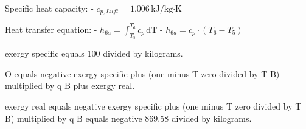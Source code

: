 Specific heat capacity:  
- \( c_{p,Luft} = 1.006 \, \text{kJ/kg·K} \)  

Heat transfer equation:  
- \( h_{6a} = \int_{T_5}^{T_6} c_p \, \text{dT} \)  
- \( h_{6a} = c_p \cdot \left( T_6 - T_5 \right) \)

exergy specific equals 100 divided by kilograms.  

O equals negative exergy specific plus (one minus T zero divided by T B) multiplied by q B plus exergy real.  

exergy real equals negative exergy specific plus (one minus T zero divided by T B) multiplied by q B equals negative 869.58 divided by kilograms.